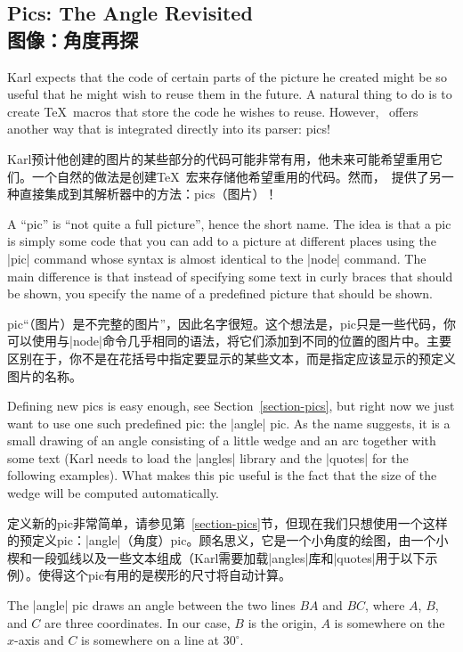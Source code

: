 

\subsection{Pics: The Angle Revisited\\图像：角度再探}

Karl expects that the code of certain parts of the picture he created might be
so useful that he might wish to reuse them in the future. A natural thing to do
is to create \TeX\ macros that store the code he wishes to reuse. However,
\tikzname\ offers another way that is integrated directly into its parser:
pics!

Karl预计他创建的图片的某些部分的代码可能非常有用，他未来可能希望重用它们。一个自然的做法是创建\TeX\ 宏来存储他希望重用的代码。然而，\tikzname\ 提供了另一种直接集成到其解析器中的方法：pics（图片）！


A ``pic'' is ``not quite a full picture'', hence the short name. The idea is
that a pic is simply some code that you can add to a picture at different
places using the |pic| command whose syntax is almost identical to the |node|
command. The main difference is that instead of specifying some text in curly
braces that should be shown, you specify the name of a predefined picture that
should be shown.

pic``（图片）是不完整的图片''，因此名字很短。这个想法是，pic只是一些代码，你可以使用与|node|命令几乎相同的语法，将它们添加到不同的位置的图片中。主要区别在于，你不是在花括号中指定要显示的某些文本，而是指定应该显示的预定义图片的名称。


Defining new pics is easy enough, see Section~\ref{section-pics}, but right now
we just want to use one such predefined pic: the |angle| pic. As the name
suggests, it is a small drawing of an angle consisting of a little wedge and an
arc together with some text (Karl needs to load the |angles| library and the
|quotes| for the following examples). What makes this pic useful is the fact
that the size of the wedge will be computed automatically.

定义新的pic非常简单，请参见第~\ref{section-pics}节，但现在我们只想使用一个这样的预定义pic：|angle|（角度）pic。顾名思义，它是一个小角度的绘图，由一个小楔和一段弧线以及一些文本组成（Karl需要加载|angles|库和|quotes|用于以下示例）。使得这个pic有用的是楔形的尺寸将自动计算。


The |angle| pic draws an angle between the two lines $BA$ and $BC$, where $A$,
$B$, and $C$ are three coordinates. In our case, $B$ is the origin, $A$ is
somewhere on the $x$-axis and $C$ is somewhere on a line at $30^\circ$.
%

